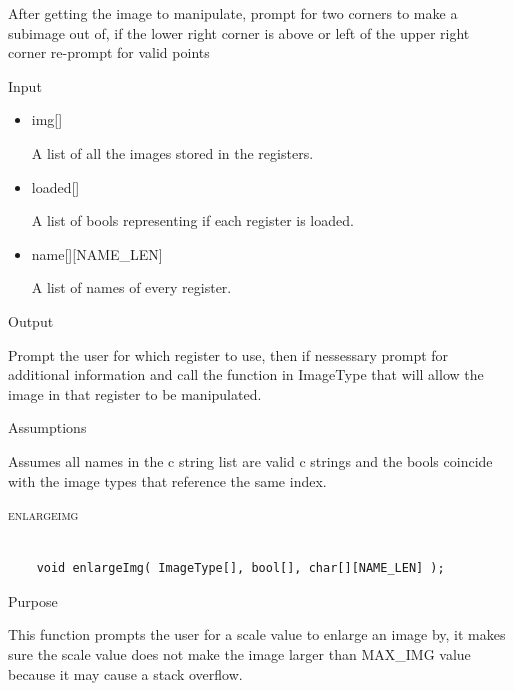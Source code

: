 \documentclass[pdftex, 11pt]{article}
\begin{document}
\begin{description}
\begin{description}
				After getting the image to manipulate, prompt for two corners to make a
				subimage out of, if the lower right corner is above or left of the upper
				right corner re-prompt for valid points

			\item{Input}

				\begin{itemize}

					\item{img[]}

						A list of all the images stored in the registers.

					\item{loaded[]}

						A list of bools representing if each register is loaded.

					\item{name[][NAME\_LEN]}

						A list of names of every register.

				\end{itemize}

			\item{Output}

				Prompt the user for which register to use, then if nessessary
				prompt for additional information and call the function
				in ImageType that will allow the image in that register to
				be manipulated.

			\item{Assumptions}

				Assumes all names in the c string list are valid c
				strings and the bools coincide with the image types that
				reference the same index.

		\end{description}



	\item{\textsc{enlargeimg}}

		\begin{lstlisting}

	void enlargeImg( ImageType[], bool[], char[][NAME_LEN] );
		\end{lstlisting}

		\begin{description}
			\item{Purpose}

				This function prompts the user for a scale value to enlarge an image by, it
				makes sure the scale value does not make the image larger than MAX\_IMG value
				because it may cause a stack overflow.


\end{description}
\end{description}
\end{document}
